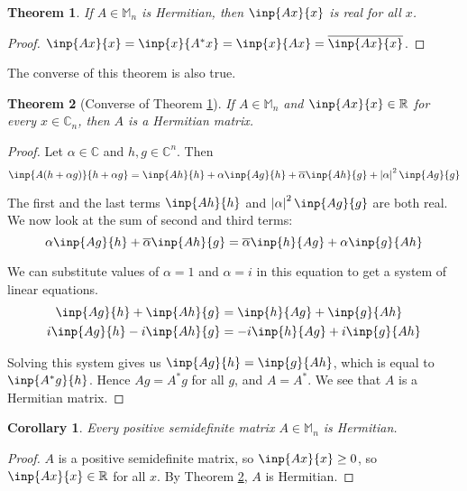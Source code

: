 \documentclass[twofold]{article}
\newcommand*\conj[1]{\overline{#1}}
\newcommand*\adj[1]{#1^*}
\newcommand*\abs[1]{\left \vert #1 \right\vert}
\theoremstyle{plain}
\newtheorem{theorem}{Theorem}
\newtheorem*{corollary}{Corollary}
\theoremstyle{definition}
\theoremstyle{remark}
\begin{document}
\begin{theorem} \label{hermit_real} If \(A \in \mathbb{M}_n\) is Hermitian, then \(\inp{Ax}{x}\) is real for all \(x\). \end{theorem}
\begin{proof} \(\inp{Ax}{x} = \inp{x}{\adj{A}x} = \inp{x}{Ax} = \conj{\inp{Ax}{x}}\). \end{proof}

The converse of this theorem is also true.

\begin{theorem}[Converse of Theorem \ref{hermit_real}]\label{eig_real_herm} If \(A \in \mathbb{M}_n\) and \(\inp{Ax}{x} \in \mathbb{R}\) for every \(x \in \mathbb{C}_n\), then \(A\) is a Hermitian matrix. \end{theorem}

\begin{proof} Let \(\alpha \in \mathbb{C}\) and \(h, g \in \mathbb{C}^n\). Then
\[\inp{A(h + \alpha g)}{h + \alpha g} = \inp{Ah}{h} + \alpha \inp{Ag}{h} + \conj{\alpha} \inp{Ah}{g} + \abs{\alpha}^2 \inp{Ag}{g} \]

The first and the last terms \(\inp{Ah}{h}\) and \(\abs{\alpha}^2 \inp{Ag}{g}\) are both real. We now look at the sum of second and third terms:
\[\alpha \inp{Ag}{h} + \conj{\alpha} \inp{Ah}{g} = \conj{\alpha} \inp{h}{Ag} + \alpha \inp{g}{Ah} \]

We can substitute values of \(\alpha = 1\) and \(\alpha = i\)  in this equation to get a system of linear equations. 
\begin{equation*}
\begin{aligned}
\inp{Ag}{h}  + \inp{Ah}{g} & =  \inp{h}{Ag}  + \inp{g}{Ah} \\
i \inp{Ag}{h}  - i \inp{Ah}{g}  & = -i \inp{h}{Ag} +  i \inp{g}{Ah} 
\end{aligned}
\end{equation*}

Solving this system gives us \(\inp{Ag}{h} = \inp{g}{Ah}\), which is equal to \(\inp{\adj{A}g}{h}\). Hence \(Ag = \adj{A}g\) for all \(g\), and \(A = \adj{A}\). We see that \(A\) is a Hermitian matrix.
\end{proof}

\begin{corollary}Every positive semidefinite matrix \(A \in \mathbb{M}_n\) is Hermitian.\end{corollary}
\begin{proof} \(A\) is a positive semidefinite matrix, so \(\inp{Ax}{x} \ge 0 \),  so \(\inp{Ax}{x} \in \mathbb{R}\) for all \(x\). By Theorem \ref{eig_real_herm}, \(A\) is Hermitian. \end{proof}
\end{document}
